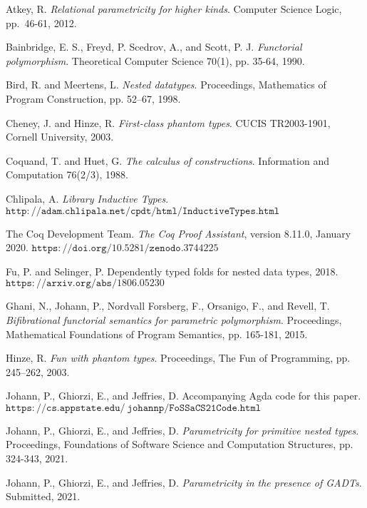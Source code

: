 \documentclass[9pt]{entcs}
\begin{document}
\begin{thebibliography}{10}\label{bibliography}

 Atkey, R.  {\em Relational parametricity for higher
  kinds}.  Computer Science Logic, pp.~46-61, 2012.

 Bainbridge, E. S., Freyd, P. Scedrov, A., and Scott,
  P. J. {\em Functorial polymorphism}. Theoretical Computer Science
  70(1), pp. 35-64, 1990.

 Bird, R. and Meertens, L. {\em Nested
  datatypes}. Proceedings, Mathematics of Program Construction,
  pp. 52–67, 1998.

 Cheney, J. and Hinze, R. {\em First-class phantom
 types}. CUCIS TR2003-1901, Cornell University, 2003.

 Coquand, T. and Huet, G. {\em The calculus of
  constructions}. Information and Computation 76(2/3), 1988.

 Chlipala, A. {\em Library Inductive
  Types}. $\mathtt{http://adam.chlipala.net/cpdt/html/InductiveTypes.html}$

 The Coq Development Team. {\em The Coq Proof
  Assistant}, version 8.11.0, January 2020.
  $\mathtt{https://doi.org/10.5281/zenodo.3744225}$

 Fu, P. and Selinger, P.  Dependently typed folds for
  nested data types, 2018. $\mathtt{https://arxiv.org/abs/1806.05230}$ 
  
 Ghani, N., Johann, P., Nordvall Forsberg, F.,
  Orsanigo, F., and Revell, T. {\em Bifibrational functorial semantics
    for parametric polymorphism}. Proceedings, Mathematical
  Foundations of Program Semantics, pp. 165-181, 2015.

 Hinze, R. {\em Fun with phantom types}. Proceedings,
 The Fun of Programming, pp. 245–262, 2003.

 Johann, P., Ghiorzi, E., and Jeffries,
  D. Accompanying Agda code for this paper.
    $\mathtt{https://cs.appstate.edu/~johannp/FoSSaCS21Code.html}$
 
 Johann, P., Ghiorzi, E., and Jeffries, D. {\em
  Parametricity for primitive nested types}. Proceedings, Foundations
  of Software Science and Computation Structures, pp. 324-343, 2021.

 Johann, P., Ghiorzi, E., and Jeffries, D. {\em
  Parametricity in the presence of GADTs}. Submitted, 2021.


\end{thebibliography}
\end{document}
